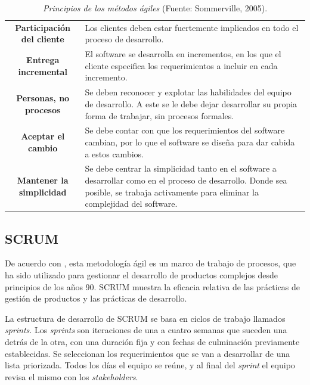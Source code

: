 	\begin{table}[t]
		\small
		\caption[Principios de los m\'{e}todos \'{a}giles]{\textit{Principios de los m\'{e}todos \'{a}giles} (Fuente: Sommerville, 2005).}
		\centering
		\setlength{\extrarowheight}{\altocelda}
		\begin{tabulary}{\anchotabla}{|c|J|}
			\hline
			 & \\ \hline
			\textbf{Participaci\'{o}n del cliente} & Los clientes deben estar fuertemente implicados en todo el proceso de desarrollo.\\ \hline
			\textbf{Entrega incremental} & El software se desarrolla en incrementos, en los que el cliente especifica los requerimientos a incluir en cada incremento.\\ \hline
			\textbf{Personas, no procesos} & Se deben reconocer y explotar las habilidades del equipo de desarrollo. A este se le debe dejar desarrollar su propia forma de trabajar, sin procesos formales.\\ \hline
			\textbf{Aceptar el cambio} & Se debe contar con que los requerimientos del software cambian, por lo que el software se dise\~{n}a para dar cabida a estos cambios.\\ \hline
			\textbf{Mantener la simplicidad} & Se debe centrar la simplicidad tanto en el software a desarrollar como en el proceso de desarrollo. Donde sea posible, se trabaja activamente para eliminar la complejidad del software.\\ \hline
		\end{tabulary}
	\end{table}

		\subsection{SCRUM}
De acuerdo con \cite{Schwaber&Sutherland}, esta metodolog\'{i}a \'{a}gil es un marco de trabajo de procesos, que ha sido utilizado para gestionar el desarrollo de productos complejos desde principios de los a\~{n}os 90. SCRUM muestra la eficacia relativa de las pr\'{a}cticas de gesti\'{o}n de productos y las pr\'{a}cticas de desarrollo.

La estructura de desarrollo de SCRUM se basa en ciclos de trabajo llamados \textit{sprints}. Los \textit{sprints} son iteraciones de una a cuatro semanas que suceden una detr\'{a}s de la otra, con una duraci\'{o}n fija y con fechas de culminaci\'{o}n previamente establecidas. Se seleccionan los requerimientos que se van a desarrollar de una lista priorizada. Todos los d\'{i}as el equipo se re\'{u}ne, y al final del \textit{sprint} el equipo revisa el mismo con los \textit{stakeholders}.

